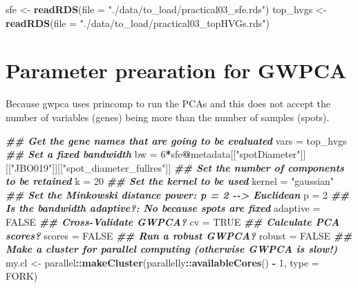 \documentclass[
]{book}
\newenvironment{Shaded}{\begin{snugshade}}{\end{snugshade}}
\newcommand{\AttributeTok}[1]{\textcolor[rgb]{0.13,0.29,0.53}{#1}}
\newcommand{\ConstantTok}[1]{\textcolor[rgb]{0.56,0.35,0.01}{#1}}
\newcommand{\DecValTok}[1]{\textcolor[rgb]{0.00,0.00,0.81}{#1}}
\newcommand{\DocumentationTok}[1]{\textcolor[rgb]{0.56,0.35,0.01}{\textbf{\textit{#1}}}}
\newcommand{\FunctionTok}[1]{\textcolor[rgb]{0.13,0.29,0.53}{\textbf{#1}}}
\newcommand{\NormalTok}[1]{#1}
\newcommand{\OtherTok}[1]{\textcolor[rgb]{0.56,0.35,0.01}{#1}}
\newcommand{\SpecialCharTok}[1]{\textcolor[rgb]{0.81,0.36,0.00}{\textbf{#1}}}
\newcommand{\StringTok}[1]{\textcolor[rgb]{0.31,0.60,0.02}{#1}}
\begin{document}
\begin{Shaded}
\begin{Highlighting}[]
\NormalTok{sfe }\OtherTok{\textless{}{-}} \FunctionTok{readRDS}\NormalTok{(}\AttributeTok{file =} \StringTok{"./data/to\_load/practical03\_sfe.rds"}\NormalTok{)}
\NormalTok{top\_hvgs }\OtherTok{\textless{}{-}} \FunctionTok{readRDS}\NormalTok{(}\AttributeTok{file =} \StringTok{"./data/to\_load/practical03\_topHVGs.rds"}\NormalTok{)}
\end{Highlighting}
\end{Shaded}

\hypertarget{parameter-prearation-for-gwpca}{%
\section{Parameter prearation for GWPCA}\label{parameter-prearation-for-gwpca}}

Because gwpca uses princomp to run the PCAs and this does not accept the number of variables (genes) being more than the number of samples (spots).

\begin{Shaded}
\begin{Highlighting}[]
\DocumentationTok{\#\# Get the gene names that are going to be evaluated}
\NormalTok{vars }\OtherTok{=}\NormalTok{ top\_hvgs}
\DocumentationTok{\#\# Set a fixed bandwidth}
\NormalTok{bw }\OtherTok{=} \DecValTok{6}\SpecialCharTok{*}\NormalTok{sfe}\SpecialCharTok{@}\NormalTok{metadata[[}\StringTok{"spotDiameter"}\NormalTok{]][[}\StringTok{"JBO019"}\NormalTok{]][[}\StringTok{"spot\_diameter\_fullres"}\NormalTok{]]}
\DocumentationTok{\#\# Set the number of components to be retained}
\NormalTok{k }\OtherTok{=} \DecValTok{20}
\DocumentationTok{\#\# Set the kernel to be used}
\NormalTok{kernel }\OtherTok{=} \StringTok{"gaussian"}
\DocumentationTok{\#\# Set the Minkowski distance power: p = 2 {-}{-}\textgreater{} Euclidean}
\NormalTok{p }\OtherTok{=} \DecValTok{2}
\DocumentationTok{\#\# Is the bandwidth adaptive?: No because spots are fixed}
\NormalTok{adaptive }\OtherTok{=} \ConstantTok{FALSE}
\DocumentationTok{\#\# Cross{-}Validate GWPCA?}
\NormalTok{cv }\OtherTok{=} \ConstantTok{TRUE}
\DocumentationTok{\#\# Calculate PCA scores?}
\NormalTok{scores }\OtherTok{=} \ConstantTok{FALSE}
\DocumentationTok{\#\# Run a robust GWPCA?}
\NormalTok{robust }\OtherTok{=} \ConstantTok{FALSE}
\DocumentationTok{\#\# Make a cluster for parallel computing (otherwise GWPCA is slow!)}
\NormalTok{my.cl }\OtherTok{\textless{}{-}}\NormalTok{ parallel}\SpecialCharTok{::}\FunctionTok{makeCluster}\NormalTok{(parallelly}\SpecialCharTok{::}\FunctionTok{availableCores}\NormalTok{() }\SpecialCharTok{{-}} \DecValTok{1}\NormalTok{, }\AttributeTok{type =} \StringTok{\textquotesingle{}FORK\textquotesingle{}}\NormalTok{)}
\end{Highlighting}
\end{Shaded}
\end{document}
